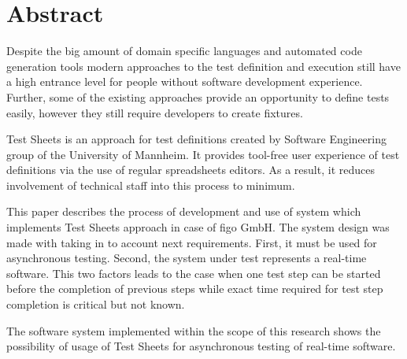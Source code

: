 \chapter{Abstract}
\label{chap:abstract}
Despite the big amount of domain specific languages and automated code generation tools modern approaches to the test definition and execution still have a high entrance level for people without software development experience. Further, some of the existing approaches provide an opportunity to define tests easily, however they still require developers to create fixtures. 

Test Sheets is an approach for test definitions created by Software Engineering group of the University of Mannheim. It provides  tool-free user experience of test definitions via the use of regular spreadsheets editors.
As a result, it reduces involvement of technical staff into this process to minimum.

This paper describes the process of development and use of system which implements Test Sheets approach in case of figo GmbH. The system design was made with taking in to account next requirements. First, it must be used for asynchronous testing. Second, the system under test represents a real-time software. This two factors leads to the case when one test step can be started before the completion of previous steps while exact time required for test step completion is critical but not known.

The software system implemented within the scope of this research shows the possibility of usage of Test Sheets for asynchronous testing of real-time software.

